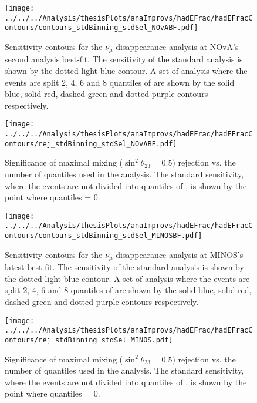 


\begin{figure}
  \centering
\texttt{[image: ../../../Analysis/thesisPlots/anaImprovs/hadEFrac/hadEFracContours/contours\_stdBinning\_stdSel\_NOvABF.pdf]}
  \caption{Sensitivity contours for the $\nu_\mu$ disappearance analysis at
    NOvA's second analysis best-fit. The sensitivity of the standard
    analysis is shown by the dotted light-blue contour. A set of analysis
    where the events are split 2, 4, 6 and 8 quantiles of \hadefrac{}
    are shown by the solid blue, solid red, dashed green and dotted
    purple contours respectively.} 
  \label{fig:hadEFracContour_NOvA}
\end{figure}

\begin{figure}
  \centering
  \texttt{[image: ../../../Analysis/thesisPlots/anaImprovs/hadEFrac/hadEFracContours/rej\_stdBinning\_stdSel\_NOvABF.pdf]}
  \caption{Significance of maximal mixing ($\sin^2\theta_{23} = 0.5$)
    rejection vs. the number of \hadefrac{} quantiles used in the
    analysis. The standard sensitivity, where the events are not
    divided into quantiles of \hadefrac{}, is shown by the point where quantiles = 0.} 
  \label{fig:hadEFracRej_NOvA}
\end{figure}

\begin{figure}
  \centering
\texttt{[image: ../../../Analysis/thesisPlots/anaImprovs/hadEFrac/hadEFracContours/contours\_stdBinning\_stdSel\_MINOSBF.pdf]}
  \caption{Sensitivity contours for the $\nu_\mu$ disappearance analysis at
    MINOS's latest best-fit. The sensitivity of the standard
    analysis is shown by the dotted light-blue contour. A set of analysis
    where the events are split 2, 4, 6 and 8 quantiles of \hadefrac{}
    are shown by the solid blue, solid red, dashed green and dotted
    purple contours respectively.} 
  \label{fig:hadEFracContour_MINOS}
\end{figure}

\begin{figure}
  \centering
  \texttt{[image: ../../../Analysis/thesisPlots/anaImprovs/hadEFrac/hadEFracContours/rej\_stdBinning\_stdSel\_MINOS.pdf]}
  \caption{Significance of maximal mixing ($\sin^2\theta_{23} = 0.5$)
    rejection vs. the number of \hadefrac{} quantiles used in the
    analysis. 
    The standard sensitivity, where the events are not
    divided into quantiles of \hadefrac{}, is shown by the point where quantiles = 0.
  } 
  \label{fig:hadEFracRej_MINOS}
\end{figure}

